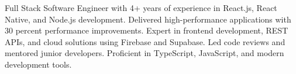 

\begin{cvparagraph}

Full Stack Software Engineer with 4+ years of experience in React.js, React Native, and Node.js development. Delivered high-performance applications with 30 percent performance improvements. Expert in frontend development, REST APIs, and cloud solutions using Firebase and Supabase. Led code reviews and mentored junior developers. Proficient in TypeScript, JavaScript, and modern development tools.
\end{cvparagraph}
